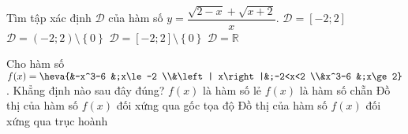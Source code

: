 \begin{ex}%
    Tìm tập xác định $\mathscr{D}$ của hàm số $y=\dfrac{\sqrt{2-x}+\sqrt{x+2}}{x}$.
    \choice
    {$\mathscr{D}=[-2;2]$}
    {$\mathscr{D}=(-2;2)\setminus\left\{0\right\}$}
    {\True $\mathscr{D}=[-2;2]\setminus\left\{0\right\}$}
    {$\mathscr{D}=\mathbb{R}$}
\end{ex}

\begin{ex}%
    Cho hàm số $f(x)=\heva{&-x^3-6 &;x\le-2 \\&\left| x\right|&;-2<x<2 \\&x^3-6 &;x\ge 2}$. Khẳng định nào sau đây đúng?
    \choice
    {$f(x)$ là hàm số lẻ}
    {\True $f(x)$ là hàm số chẵn}
    {Đồ thị của hàm số $f(x)$ đối xứng qua gốc tọa độ}
    {Đồ thị của hàm số $f(x)$ đối xứng qua trục hoành}
\end{ex}

